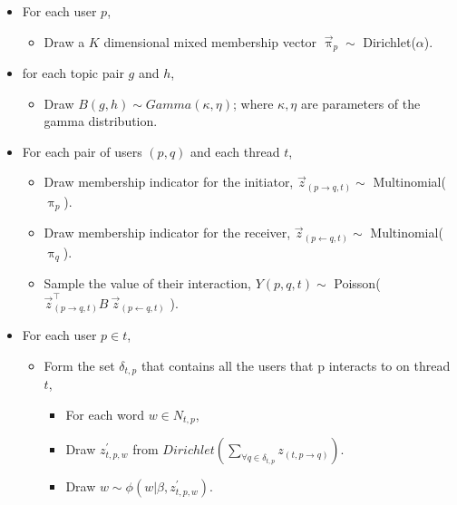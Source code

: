 \documentclass{sig-alternate}
\begin{document}
\begin{itemize}
  \item For each user $p $,
  \begin{itemize}
    \item Draw a $K$ dimensional mixed membership vector 
    $\overset{\rightarrow}{\uppi}_{p} \sim$ Dirichlet($\alpha$).
  \end{itemize}
  \item for each topic pair $g$ and $h$,
    \begin{itemize}
    \item Draw $B(g,h) \sim Gamma(\kappa,\eta)$; where $\kappa, \eta$ are
    parameters of the gamma distribution.
  \end{itemize}

  \item For each pair of users $(p, q)$ and each thread $t$,
  \begin{itemize}
    \item Draw membership indicator for the initiator, 
    $\overset{\rightarrow}{z}_{(p \rightarrow q,t)} \sim$
    Multinomial($\uppi_{p}$).
    \item Draw membership indicator for the receiver,
    $\overset{\rightarrow}{z}_{(p \leftarrow q,t)} \sim$
    Multinomial($\uppi_{q}$).
    \item Sample the value of their interaction, $Y(p,q,t) \sim$
    Poisson( ${\overset{\rightarrow}{z}}^{\top}_{(p \rightarrow q,t)}
    B~\overset{\rightarrow}{z}_{(p \leftarrow q,t)}$ ). 
	\end{itemize}
	\item For each user $p \in t$,
	\begin{itemize}
	  \item Form the set $\delta_{t,p}$ that contains all the users that p
	  interacts to on thread $t$,
	  \begin{itemize}
	    \item For each word $w \in N_{t,p}$, 
	    \item Draw $z^{'}_{t,p,w}$ from $Dirichlet(\sum_{\forall q\in \delta_{t,p}} z_{(t,p
	    \rightarrow q)})$.
	    \item Draw $w \sim \phi(w|\beta,z^{'}_{t,p,w}) $.
	  \end{itemize}
  \end{itemize}
\end{itemize}  
\end{document}

